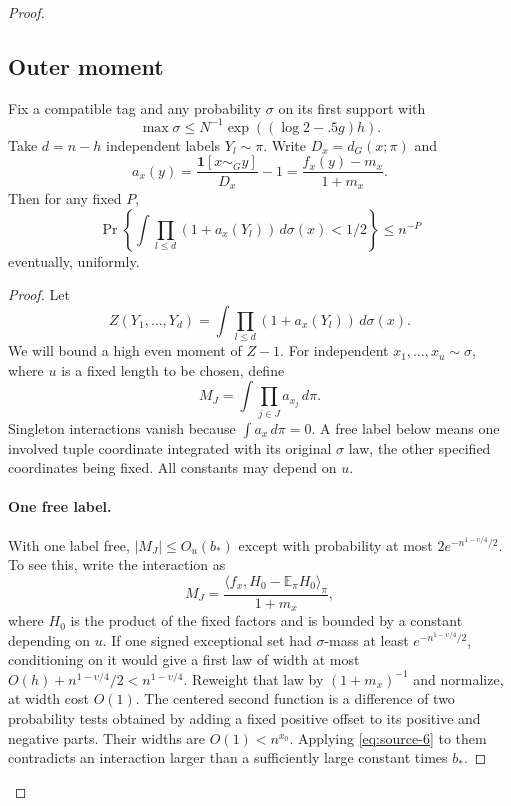 \begin{proof}
\subsection{Outer moment}
\label{sec:outer-moment}

\begin{lemma}\label{lem:jump-outer-mass-tail}
Fix a compatible tag and any probability \(\sigma\) on its first support with
\[
 \max\sigma\le N^{-1}\exp((\log2-.5g)h).
\]
Take \(d=n-h\) independent labels \(Y_l\sim\pi\). Write \(D_x=d_G(x;\pi)\) and
\[
 a_x(y)=\frac{\mathbf1[x\sim_G y]}{D_x}-1=\frac{f_x(y)-m_x}{1+m_x}.
\]
Then for any fixed \(P\),
\begin{equation}
 \Pr\left\{\int \prod_{l\le d}(1+a_x(Y_l))\,d\sigma(x)<1/2\right\}
 \le n^{-P}
 \label{eq:source-8}
\end{equation}
eventually, uniformly.
\end{lemma}

\begin{proof}
Let
\[
 Z(Y_1,\ldots,Y_d)=\int\prod_{l\le d}(1+a_x(Y_l))\,d\sigma(x).
\]
We will bound a high even moment of \(Z-1\). For independent \(x_1,\ldots,x_u\sim\sigma\), where \(u\) is a fixed length to be chosen, define
\[
 M_J=\int\prod_{j\in J}a_{x_j}\,d\pi.
\]
Singleton interactions vanish because \(\int a_x\,d\pi=0\). A free label below means one involved tuple coordinate integrated with its original \(\sigma\) law, the other specified coordinates being fixed. All constants may depend on \(u\).

\paragraph{One free label.}
With one label free, \(|M_J|\le O_u(b_*)\) except with probability at most
\(2e^{-n^{1-\upsilon/4}/2}\).
To see this, write the interaction as
\[
 M_J=\frac{\langle f_x,H_0-\mathbb E_\pi H_0\rangle_\pi}{1+m_x},
\]
where \(H_0\) is the product of the fixed factors and is bounded by a constant depending on \(u\). If one signed exceptional set had \(\sigma\)-mass at least \(e^{-n^{1-\upsilon/4}/2}\), conditioning on it would give a first law of width at most
\(O(h)+n^{1-\upsilon/4}/2<n^{1-\upsilon/4}\).
Reweight that law by \((1+m_x)^{-1}\) and normalize, at width cost \(O(1)\). The centered second function is a difference of two probability tests obtained by adding a fixed positive offset to its positive and negative parts. Their widths are \(O(1)<n^{x_0}\). Applying \eqref{eq:source-6} to them contradicts an interaction larger than a sufficiently large constant times \(b_*\).


\end{proof}
\end{proof}

